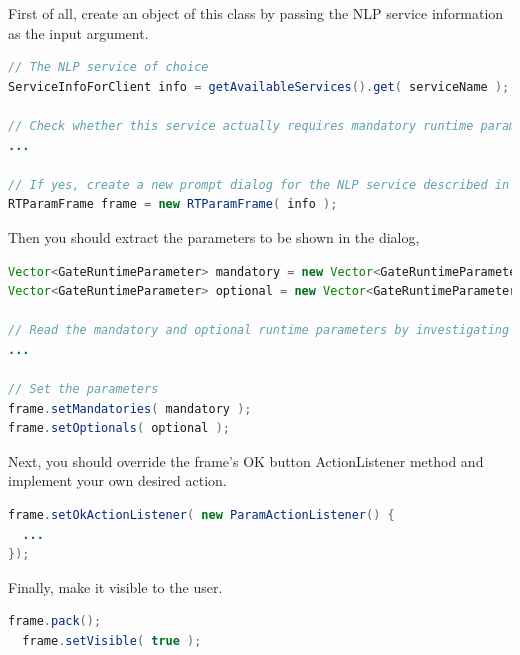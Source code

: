 First of all, create an object of this class by passing the NLP service information as the input argument.  

\begin{lstlisting}[language=Java,xleftmargin=4mm,columns=flexible]
// The NLP service of choice
ServiceInfoForClient info = getAvailableServices().get( serviceName );

// Check whether this service actually requires mandatory runtime parameters
...

// If yes, create a new prompt dialog for the NLP service described in the 'info' argument
RTParamFrame frame = new RTParamFrame( info );   
\end{lstlisting}

Then you should extract the parameters to be shown in the dialog,
\begin{lstlisting}[language=Java,xleftmargin=4mm,columns=flexible]
Vector<GateRuntimeParameter> mandatory = new Vector<GateRuntimeParameter>();
Vector<GateRuntimeParameter> optional = new Vector<GateRuntimeParameter>();

// Read the mandatory and optional runtime parameters by investigating the 'info' parameters list
...

// Set the parameters
frame.setMandatories( mandatory );
frame.setOptionals( optional );
\end{lstlisting}

Next, you should override the frame's OK button ActionListener method and implement your own desired action.

\begin{lstlisting}[language=Java,xleftmargin=4mm,columns=flexible]
frame.setOkActionListener( new ParamActionListener() {
  ...
});
\end{lstlisting}

Finally, make it visible to the user.

\begin{lstlisting}[language=Java,xleftmargin=4mm,columns=flexible]
  frame.pack();
  frame.setVisible( true );
\end{lstlisting}

